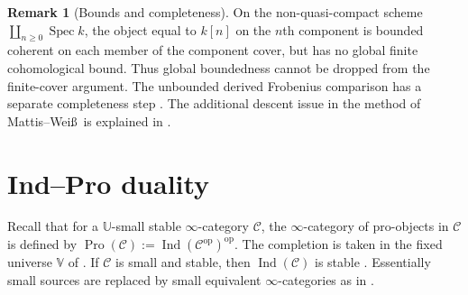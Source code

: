 \documentclass[11pt]{amsart}
\newcommand{\cC}{\mathcal{C}}
\newcommand{\cD}{\mathcal{D}}
\newcommand{\op}{{\operatorname{op}}}
\newcommand{\Pro}{\operatorname{Pro}}
\newcommand{\Ind}{\operatorname{Ind}}
\newcommand{\Catbig}{\widehat{\mathrm{Cat}}}
\theoremstyle{plain}
\theoremstyle{definition}
\newtheorem{remark}[remark]{Remark}
\numberwithin{equation}{section}
\begin{document}
\begin{remark}[Bounds and completeness]\label{rem:descent-bounds}
On the non-quasi-compact scheme $\coprod_{n\geq0}\operatorname{Spec}k$, the object equal to $k[n]$ on the $n$th component is bounded coherent on each member of the component cover, but has no global finite cohomological bound.
Thus global boundedness cannot be dropped from the finite-cover argument.
The unbounded derived Frobenius comparison has a separate completeness step \cite[Lemma 5.1; Proposition 5.2; Corollary 5.5; Theorem 5.7]{MWF}.
The additional descent issue in the method of Mattis--Wei\ss\ is explained in \cite[Remark 4.3]{MWF}.
\end{remark}

\section{Ind--Pro duality}\label{sec:indpro}
Recall that for a $\mathbb U$-small stable $\infty$-category $\cC$, the $\infty$-category of pro-objects in $\cC$ is defined by
$ \Pro(\cC):=\Ind(\cC^{\op})^{\op}$.
The completion is taken in the fixed universe $\mathbb V$ of .
If $\cC$ is small and stable, then $\Ind(\cC)$ is stable \cite[Proposition 1.1.3.6]{HA}.
Essentially small sources are replaced by small equivalent $\infty$-categories as in .

\end{document}
